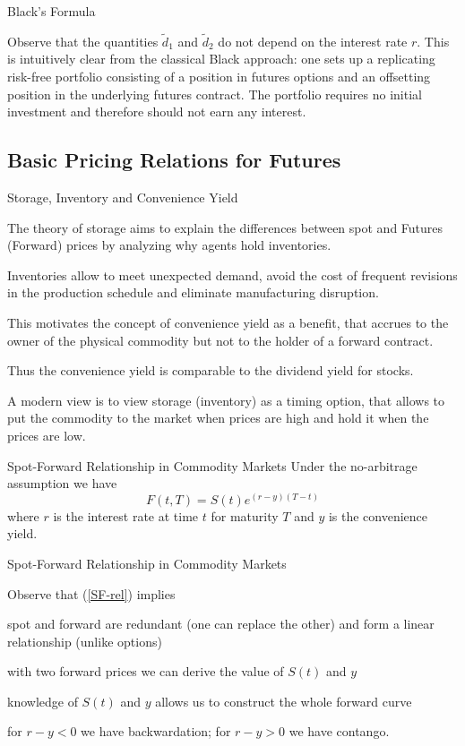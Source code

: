 {%
{Black's Formula}

Observe that the quantities $\tilde{d}_1$ and $\tilde{d}_2$ do not depend on the
interest rate $r$. This is intuitively clear from the classical
Black approach: one sets up a replicating risk-free portfolio
consisting of a position in futures options and an offsetting
position in the underlying futures contract. The portfolio
requires no initial investment and therefore should not earn any
interest.

\subsection{Basic Pricing Relations for Futures}

{Storage, Inventory and Convenience Yield}
\item<1-> The theory of storage aims to explain the differences between spot
and Futures (Forward) prices by analyzing why agents hold inventories.
\item<2-> Inventories
allow to meet unexpected demand, avoid the cost of frequent revisions in
the production schedule and eliminate manufacturing disruption.
\item<3-> This
motivates the concept of convenience yield as a benefit, that accrues to the
owner of the physical commodity but not to the holder of a forward contract.
\item<4-> Thus the convenience yield is comparable to the dividend yield for stocks.
\item<5-> A modern view is to view storage (inventory) as a timing option, that
allows to put the commodity to the market when prices are high
and hold it when the prices are low.

{Spot-Forward Relationship in Commodity Markets }
Under the no-arbitrage assumption we have
\begin{equation}\label{SF-rel}
F(t,T)=S(t)e^{(r-y)(T-t)}
\end{equation}
where $r$ is the interest rate at time $t$ for maturity $T$ and $y$ is the convenience yield.

{Spot-Forward Relationship in Commodity Markets }

Observe that (\ref{SF-rel}) implies
\item<1-> spot and forward are redundant (one can replace the other) and form a
linear relationship (unlike options)
\item<2-> with two forward prices we can derive the value of $S(t)$ and $y$
\item<3-> knowledge of $S(t)$ and $y$ allows us to construct the whole forward curve
\item<4-> for $r-y <0$ we have backwardation; for $r-y>0$ we have contango.

}
